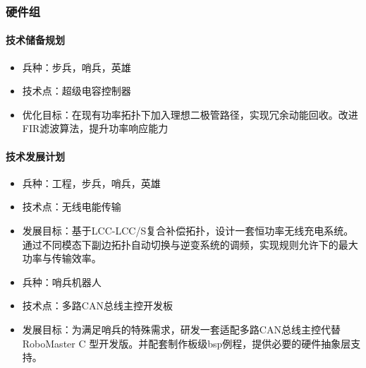 \subsubsection{硬件组}

    \paragraph{技术储备规划}


        \begin{itemize}
            \item 兵种：步兵，哨兵，英雄
            \item 技术点：超级电容控制器
            \item 优化目标：在现有功率拓扑下加入理想二极管路径，实现冗余动能回收。改进FIR滤波算法，提升功率响应能力
        \end{itemize}
        
    \paragraph{技术发展计划}


        \begin{itemize}
            \item 兵种：工程，步兵，哨兵，英雄
            \item 技术点：无线电能传输
            \item 发展目标：基于LCC-LCC/S复合补偿拓扑，设计一套恒功率无线充电系统。通过不同模态下副边拓扑自动切换与逆变系统的调频，实现规则允许下的最大功率与传输效率。
            \item 兵种：哨兵机器人
            \item 技术点：多路CAN总线主控开发板
            \item 发展目标：为满足哨兵的特殊需求，研发一套适配多路CAN总线主控代替RoboMaster C 型开发版。并配套制作板级bsp例程，提供必要的硬件抽象层支持。
        \end{itemize}